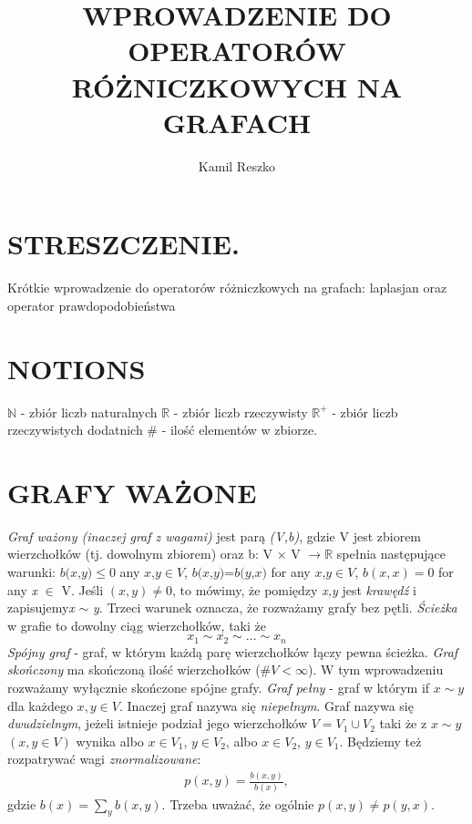 \documentclass[a4paper,12pkt]{amsart}
\title{WPROWADZENIE DO OPERATORÓW RÓŻNICZKOWYCH NA GRAFACH}
\author{Kamil Reszko}
\begin{document}
 
\maketitle 
\section*{STRESZCZENIE.} Krótkie wprowadzenie do operatorów różniczkowych na grafach: laplasjan oraz operator prawdopodobieństwa 
\section*{NOTIONS} 
$\mathbb{N}$ - zbiór liczb naturalnych \newline 
\indent $\mathbb{R}$ - zbiór liczb rzeczywisty \newline                                            
\indent $\mathbb{R}^{+}$ - zbiór liczb rzeczywistych dodatnich \newline 
\indent \# - ilość elementów w zbiorze. 
\section{GRAFY WAŻONE} 
\textit{Graf ważony (inaczej graf z wagami)} jest parą \textit{(V,b)}, gdzie V jest zbiorem wierzchołków (tj. dowolnym zbiorem) oraz  b: V $\times$ V $\rightarrow\mathbb{R}$ spełnia następujące warunki:
\indent $\textit{b(x,y)} \leq 0$ any $\textit{x,y} \in V$, \newline 
\indent $\textit{b(x,y)=b(y,x)}$ for any $\textit{x,y} \in V$, \newline 
\indent ${b(x,x) = 0}$ for any \textit{x} $\in$ V. \newline 
\indent Jeśli ${(x,y)} \ne 0$, to mówimy, że pomiędzy \textit{x,y} jest \textit{krawędź} i zapisujemy\textit{x} $\sim$ \textit{y}. Trzeci warunek oznacza, że rozważamy grafy bez pętli.\newline 
\indent \textit{Ścieżka} w grafie to dowolny ciąg wierzchołków, taki że 
$$ x_{1} \sim x_{2} \sim \dots \sim x_{n}$$ \newline 
\indent \textit{Spójny graf} - graf, w którym każdą parę wierzchołków łączy pewna ścieżka. \textit{Graf skończony} ma skończoną ilość wierzchołków ($\# V < \infty$). W tym wprowadzeniu rozważamy wyłącznie skończone spójne grafy. \newline 
\indent\textit{Graf pełny} - graf w którym if $x \sim y$ dla każdego $ x,y \in V$. Inaczej graf nazywa się \textit{niepełnym}.\newline 
\indent Graf nazywa się \textit{dwudzielnym}, jeżeli istnieje podział jego wierzchołków $V = V_{1} \cup V_{2}$ taki że z $x \sim y$  $(x,y \in V)$ wynika albo $ x \in V_{1}$, $y \in V_{2}$, albo $x \in V_{2}$, $y \in V_{1}$.\newline 
\indent Będziemy też rozpatrywać wagi \textit{znormalizowane}: 
\begin{eqnarray} 
p(x,y) = \frac{b(x,y)}{b(x)},
\end{eqnarray} 
gdzie $b(x) = \sum_{y} b(x,y)$. Trzeba uważać, że ogólnie $p(x,y) \neq p(y,x)$. 
\end{document}

